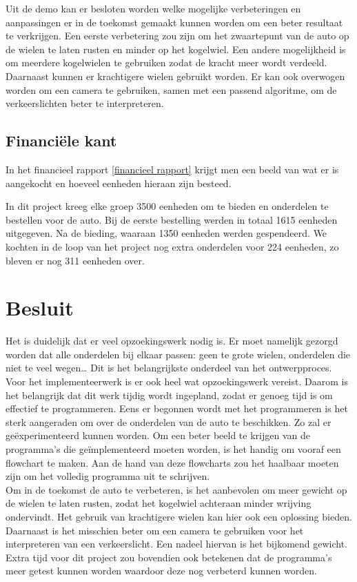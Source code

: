 \documentclass[a4paper,twoside,kulak]{kulakreport} %
\begin{document}
Uit de demo kan er besloten worden welke mogelijke verbeteringen en aanpassingen er in de toekomst gemaakt kunnen worden om een beter resultaat te verkrijgen. Een eerste verbetering zou zijn om het zwaartepunt van de auto op de wielen te laten rusten en minder op het kogelwiel. Een andere mogelijkheid is om meerdere kogelwielen te gebruiken zodat de kracht meer wordt verdeeld. Daarnaast kunnen er krachtigere wielen gebruikt worden. Er kan ook overwogen worden om een camera te gebruiken, samen met een passend algoritme, om de verkeerslichten beter te interpreteren.
\\

\subsection{Financiële kant} 
In het financieel rapport \ref{financieel rapport} krijgt men een beeld van wat er is aangekocht en hoeveel eenheden hieraan zijn besteed.  

In dit project kreeg elke groep 3500 eenheden om te bieden en onderdelen te bestellen voor de auto. Bij de eerste bestelling werden in totaal 1615 eenheden uitgegeven. Na de bieding, waaraan 1350 eenheden werden gespendeerd. We kochten in de loop van het project nog extra onderdelen voor 224 eenheden, zo bleven er nog 311 eenheden over.
\\


\section{Besluit}
Het is duidelijk dat er veel opzoekingswerk nodig is. Er moet namelijk gezorgd worden dat alle onderdelen bij elkaar passen: geen te grote wielen, onderdelen die niet te veel wegen… Dit is het belangrijkste onderdeel van het ontwerpproces.\\
Voor het implementeerwerk is er ook heel wat opzoekingswerk vereist. Daarom is het belangrijk dat dit werk tijdig wordt ingepland, zodat er genoeg tijd is om effectief te programmeren. Eens er begonnen wordt met het programmeren is het sterk aangeraden om over de onderdelen van de auto te beschikken. Zo zal er geëxperimenteerd kunnen worden. Om een beter beeld te krijgen van de programma’s die geïmplementeerd moeten worden, is het handig om vooraf een flowchart te maken. Aan de hand van deze flowcharts zou het haalbaar moeten zijn om het volledig programma uit te schrijven.\\
Om in de toekomst de auto te verbeteren, is het aanbevolen om meer gewicht op de wielen te laten rusten, zodat het kogelwiel achteraan minder wrijving ondervindt. Het gebruik van krachtigere wielen kan hier ook een oplossing bieden. Daarnaast is het misschien beter om een camera te gebruiken voor het interpreteren van een verkeerslicht. Een nadeel hiervan is het bijkomend gewicht. 
Extra tijd voor dit project zou bovendien ook betekenen dat de programma’s meer getest kunnen worden waardoor deze nog verbeterd kunnen worden.
\end{document}
